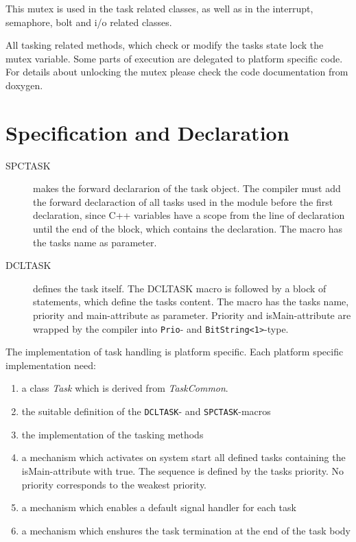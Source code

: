 This mutex is used in the task related classes, as well as in the interrupt,
semaphore, bolt and i/o related classes. 

All tasking related methods, which check or modify  the tasks state lock the 
mutex variable. Some parts of execution are delegated to platform specific
code. For details about unlocking the mutex please check the code
documentation from doxygen.



\section{Specification and Declaration}
\begin{description}
\item[SPCTASK] makes the forward declararion of the task object.
    The compiler must add the forward declaraction of all tasks
    used in the module before the first declaration, since C++
    variables have a scope from the line of declaration until 
    the end of the block, which contains the declaration.
    The macro has the tasks name as parameter.
\item[DCLTASK] defines the task itself. The DCLTASK macro is followed
    by a block of statements, which define the tasks content.
    The macro has the tasks name, priority and main-attribute as
    parameter. 
    Priority and isMain-attribute are wrapped by the compiler 
    into \verb|Prio|- and \verb|BitString<1>|-type.
\end{description}

The implementation of task handling is platform specific.
Each platform specific implementation need:
\begin{enumerate}
\item  a class {\em Task} which is derived from {\em TaskCommon}.
\item the suitable definition of the \verb|DCLTASK|- and \verb|SPCTASK|-macros
\item the implementation of the tasking methods
\item a mechanism which activates on system start
   all defined tasks containing the isMain-attribute with true. 
   The sequence is defined by the tasks priority. 
   No priority corresponds to the weakest priority.
\item a mechanism which enables a default signal handler for each task
\item a mechanism which enshures the task termination at the end of
   the task body
\end{enumerate}

